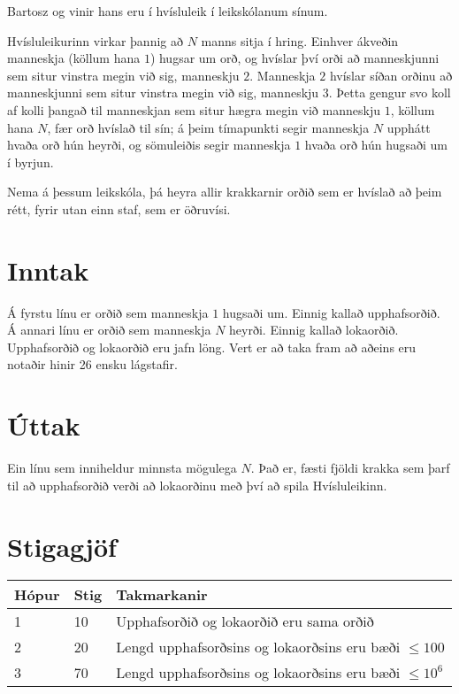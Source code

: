 
Bartosz og vinir hans eru í hvísluleik í leikskólanum sínum.

Hvísluleikurinn virkar þannig að $N$ manns sitja í hring. Einhver ákveðin manneskja (köllum hana $1$) hugsar um orð, og hvíslar því orði að manneskjunni sem situr vinstra megin við sig, manneskju $2$. Manneskja $2$ hvíslar síðan orðinu að manneskjunni sem situr vinstra megin við sig, manneskju $3$. Þetta gengur svo koll af kolli þangað til manneskjan sem situr hægra megin við manneskju $1$, köllum hana $N$, fær orð hvíslað til sín; á þeim tímapunkti segir manneskja $N$ upphátt hvaða orð hún heyrði, og sömuleiðis segir manneskja $1$ hvaða orð hún hugsaði um í byrjun.

Nema á þessum leikskóla, þá heyra allir krakkarnir orðið sem er hvíslað að þeim rétt, fyrir utan einn staf, sem er öðruvísi.

\section*{Inntak}
Á fyrstu línu er orðið sem manneskja $1$ hugsaði um. Einnig kallað
upphafsorðið. Á annari línu er orðið sem manneskja $N$ heyrði. Einnig kallað
lokaorðið. Upphafsorðið og lokaorðið eru jafn löng. Vert er að taka fram að
aðeins eru notaðir hinir 26 ensku lágstafir.

\section*{Úttak}
Ein línu sem inniheldur minnsta mögulega $N$. Það er, fæsti fjöldi krakka sem
þarf til að upphafsorðið verði að lokaorðinu með því að spila Hvísluleikinn.

\section*{Stigagjöf}
\begin{tabular}{|l|l|l|}
\hline
Hópur & Stig & Takmarkanir \\ \hline
1     & 10   & Upphafsorðið og lokaorðið eru sama orðið \\ \hline
2     & 20   & Lengd upphafsorðsins og lokaorðsins eru bæði $\leq 100$ \\ \hline
3     & 70   & Lengd upphafsorðsins og lokaorðsins eru bæði $\leq 10^6$ \\ \hline
\end{tabular}
